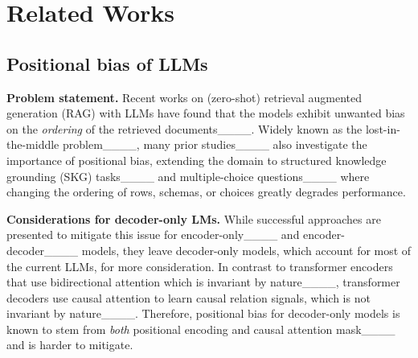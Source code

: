 \section{Related Works}
\subsection{Positional bias of LLMs}
\noindent \textbf{Problem statement.} 
Recent works on (zero-shot) retrieval augmented generation (RAG) with LLMs have found that the models exhibit unwanted bias on the \textit{ordering} of the retrieved documents____.
Widely known as the lost-in-the-middle problem____, many prior studies____ also investigate the importance of positional bias, extending the domain to 
structured knowledge grounding (SKG) tasks____ and multiple-choice questions____ where changing the ordering of rows, schemas, or choices greatly degrades performance.

\noindent \textbf{Considerations for decoder-only LMs.} While successful approaches are presented to mitigate this issue for encoder-only____ and encoder-decoder____ models, they leave decoder-only models, which account for most of the current LLMs, for more consideration. In contrast to transformer encoders that use bidirectional attention which is invariant by nature____, transformer decoders use causal attention to learn causal relation signals, which is not invariant by nature____. Therefore, positional bias for decoder-only models is known to stem from \textit{both} positional encoding and causal attention mask____ and is harder to mitigate.



